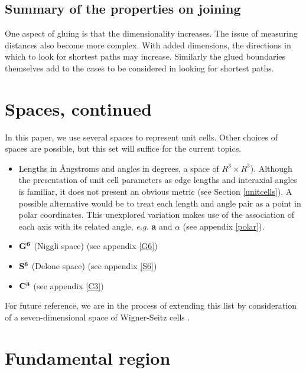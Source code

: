 \documentclass[preprint]{iucr}              %
\numberwithin{equation}{section}
\newcommand{\SVI}[0]{$\bf{S^{6}}$}
\newcommand{\GVI}[0]{$\bf{G^{6}}$}
\newcommand{\CIII}[0]{$\bf{C^{3}}$}
\begin{document}
\subsection{Summary of the properties on joining}

One aspect of gluing is that the dimensionality increases. The issue of measuring distances also 
become more complex. With added dimensions, the directions in which to look for shortest paths may increase. Similarly
the glued boundaries themselves add to the cases to
be considered in looking for shortest paths.
		
\section{Spaces, continued}

In this paper, we use several spaces to represent unit cells.
Other choices of spaces are possible, but this set will suffice 
for the current topics.
		
\begin{itemize}
	\item 	Lengths in \r{A}ngstroms and angles in degrees, a 
	space of $R^3 \times R^3$).
Although the presentation of unit cell parameters as edge lengths and
interaxial angles is familiar, it does not present an obvious metric (see Section \ref{unitcells}). A
possible alternative would be to treat each length and angle pair as
a point in polar coordinates. This unexplored variation makes use
of the association of each axis with its related angle,\textit{ e.g.} \textbf{a}
and $\alpha$ (see appendix \ref{polar}).
	\item 	\GVI{} (Niggli space)
	(see appendix \ref{G6})
	\item 	\SVI{} (Delone space)
	(see appendix \ref{S6})
	\item 	\CIII{} 
	(see appendix \ref{C3})
\end{itemize}	

For future reference, we are in the process of extending 
this list by consideration of a seven-dimensional space of Wigner-Seitz cells \cite{Bernstein2023}.
	


	
	\section{Fundamental region}
	\label{fundamentaltext}
	
\end{document}
